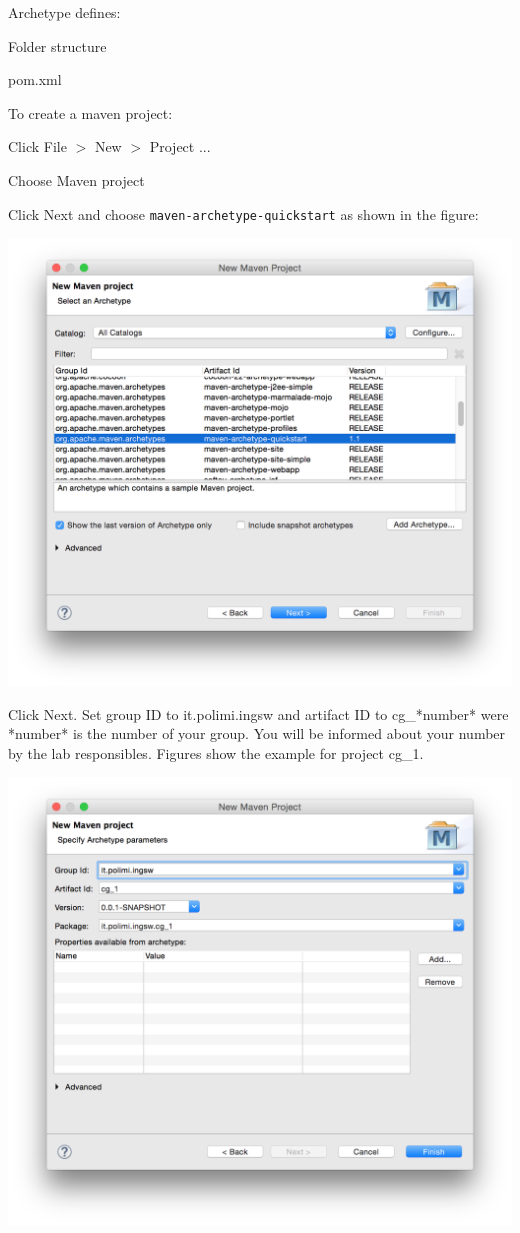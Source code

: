 \documentclass{article}
\begin{document}
Archetype defines:
\begin{compactitem}
\item Folder structure
\item pom.xml
\end{compactitem}

To create a maven project:
\begin{compactitem}
\item Click File $>$ New $>$ Project ...
\item Choose Maven project
\item Click Next and choose \texttt{maven-archetype-quickstart} as
  shown in the figure:
\begin{center}
\includegraphics[scale=0.5]{figures/2}
\end{center}
\item Click Next. Set group ID to it.polimi.ingsw and artifact ID
  to cg\_*number* were *number* is the number of your group. You will
  be informed about your number by the lab responsibles. Figures show
  the example for project cg\_1.
\begin{center}
\includegraphics[scale=0.5]{figures/3}

\end{center}
\end{compactitem}
\end{document}
